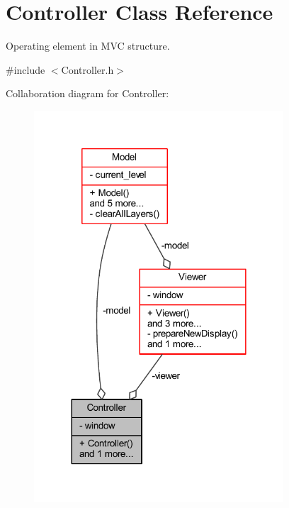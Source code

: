 \hypertarget{class_controller}{}\section{Controller Class Reference}
\label{class_controller}


Operating element in M\+VC structure.  




{\ttfamily \#include $<$Controller.\+h$>$}



Collaboration diagram for Controller\+:\nopagebreak
\begin{figure}[H]
\begin{center}
\leavevmode
\includegraphics[width=264pt]{class_controller__coll__graph}
\end{center}
\end{figure}

